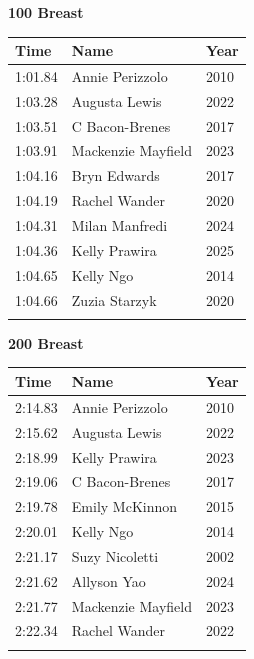 \vspace{1.2em}
\noindent\begin{minipage}[t]{0.48\textwidth}
\centering
\textbf{\textcolor{teamprimary}{100 Breast}}\par
\vspace{0.5em}
\centering
\small
\renewcommand{\arraystretch}{1.0}
\setlength{\tabcolsep}{4pt}
\begin{tabular}{@{}p{1.8cm}p{3.0cm}p{1.0cm}@{}}
\toprule
\textbf{Time} & \textbf{Name} & \textbf{Year} \\
\midrule
1:01.84 & Annie Perizzolo & 2010 \\
1:03.28 & Augusta Lewis & 2022 \\
1:03.51 & C Bacon-Brenes & 2017 \\
1:03.91 & Mackenzie Mayfield & 2023 \\
1:04.16 & Bryn Edwards & 2017 \\
1:04.19 & Rachel Wander & 2020 \\
1:04.31 & Milan Manfredi & 2024 \\
1:04.36 & Kelly Prawira & 2025 \\
1:04.65 & Kelly Ngo & 2014 \\
1:04.66 & Zuzia Starzyk & 2020 \\
\bottomrule
\vspace{0.5em}
\end{tabular}
\end{minipage}
\hfill
\begin{minipage}[t]{0.48\textwidth}
\centering
\textbf{\textcolor{teamprimary}{200 Breast}}\par
\vspace{0.5em}
\centering
\small
\renewcommand{\arraystretch}{1.0}
\setlength{\tabcolsep}{4pt}
\begin{tabular}{@{}p{1.8cm}p{3.0cm}p{1.0cm}@{}}
\toprule
\textbf{Time} & \textbf{Name} & \textbf{Year} \\
\midrule
2:14.83 & Annie Perizzolo & 2010 \\
2:15.62 & Augusta Lewis & 2022 \\
2:18.99 & Kelly Prawira & 2023 \\
2:19.06 & C Bacon-Brenes & 2017 \\
2:19.78 & Emily McKinnon & 2015 \\
2:20.01 & Kelly Ngo & 2014 \\
2:21.17 & Suzy Nicoletti & 2002 \\
2:21.62 & Allyson Yao & 2024 \\
2:21.77 & Mackenzie Mayfield & 2023 \\
2:22.34 & Rachel Wander & 2022 \\
\bottomrule
\vspace{0.5em}
\end{tabular}
\end{minipage}
